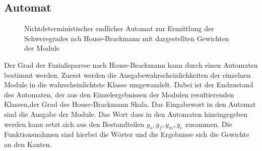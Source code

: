 \subsection{Automat}\label{automata}
\begin{figure}[b]
\begin{center}
\caption[Nichtdeterministischer endlicher Automat zur Ermittlung der Schweregrades nch House-Brackmann mit dargestellten Gewichten der Module]{Nichtdeterministischer endlicher Automat zur Ermittlung der Schweregrades nch House-Brackmann mit dargestellten Gewichten der Module}\label{cap:automata}
\end{center}
\end{figure}\label{fig:automata}

Der Grad der Fazialisparese nach House-Brackmann kann durch einen Automaten bestimmt werden. Zuerst werden die Ausgabewahrscheinlichkeiten der einzelnen Module in die wahrscheinlichtste Klasse umgewandelt. Dabei ist der Endzustand des Automaten, der aus den Einzelergebnissen der Modulen resultierenden Klassen,der Grad des House-Brackmann Skala. Das Eingabewort in den Automat sind die Ausgabe der Module. Das Wort dass in den Automaten hineingegeben werden kann setzt sich aus den Bestandteilen $y_s, y_f, y_m, y_e$ zusammen. Die Funktionsnahmen sind hierbei die Wörter und die Ergebnisse sich die Gewichte an den Kanten.

